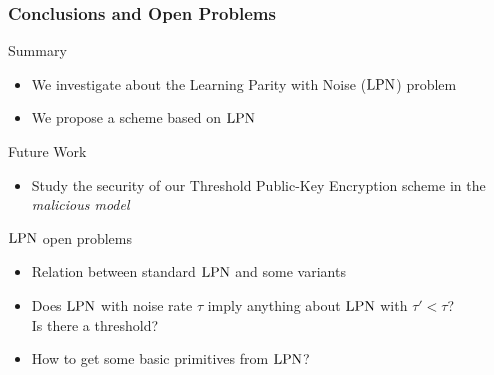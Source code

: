 \begin{frame}
 \frametitle{Conclusions and Open Problems}
 
 \begin{block}{Summary}
   \begin{itemize}
    \item We investigate about the \alert{Learning Parity with Noise} ($\mathrm{LPN}$) problem
    \item We propose a {\color{blue}{Threshold Public-Key Encryption}} scheme based on $\mathrm{LPN}$
   \end{itemize}
 \end{block}

 \begin{block}{Future Work}
\begin{itemize}
 \item Study the security of our Threshold Public-Key Encryption scheme in the \emph{malicious model}
\end{itemize}
  
 \end{block}
 
 \begin{block}{$\mathrm{LPN}$ open problems}
  \begin{itemize}
   \item<4-> Relation between standard $\mathrm{LPN}$ and some variants
   \item<5-> Does $\mathrm{LPN}$ with noise rate $\tau$ imply anything about $\mathrm{LPN}$ with $\tau' < \tau$? \\ Is there a threshold?
   \item<6-> How to get some basic primitives from $\mathrm{LPN}$?
  \end{itemize}

 \end{block}
 

\end{frame}

\appendix
{}
\setcounter{finalframe}{\value{framenumber}}

\setcounter{framenumber}{\value{finalframe}}

